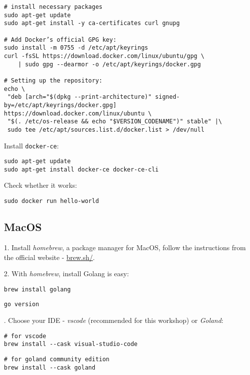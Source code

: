 \documentclass[11pt, letterpaper]{article}
\begin{document}
\begin{verbatim}
# install necessary packages
sudo apt-get update
sudo apt-get install -y ca-certificates curl gnupg

# Add Docker’s official GPG key:
sudo install -m 0755 -d /etc/apt/keyrings
curl -fsSL https://download.docker.com/linux/ubuntu/gpg \
    | sudo gpg --dearmor -o /etc/apt/keyrings/docker.gpg

# Setting up the repository:
echo \
 "deb [arch="$(dpkg --print-architecture)" signed-by=/etc/apt/keyrings/docker.gpg] https://download.docker.com/linux/ubuntu \
 "$(. /etc/os-release && echo "$VERSION_CODENAME")" stable" |\
 sudo tee /etc/apt/sources.list.d/docker.list > /dev/null
\end{verbatim}

Install \texttt{docker-ce}:

\begin{verbatim}
sudo apt-get update
sudo apt-get install docker-ce docker-ce-cli
\end{verbatim}

Check whether it works:

\begin{verbatim}
sudo docker run hello-world
\end{verbatim}

\subsection{MacOS}

1. Install \emph{homebrew}, a package manager for MacOS, follow the instructions from the official website - \href{https://brew.sh/}{brew.sh/}.
\bigskip

2. With \emph{homebrew}, install Golang is easy:

\begin{verbatim}
brew install golang
\end{verbatim}

\begin{verbatim}
go version
\end{verbatim}

. Choose your {\small IDE} - \emph{vscode} (recommended for this workshop) or \emph{Goland}:

\begin{verbatim}
# for vscode
brew install --cask visual-studio-code
\end{verbatim}

\begin{verbatim}
# for goland community edition
brew install --cask goland
\end{verbatim}
\end{document}
